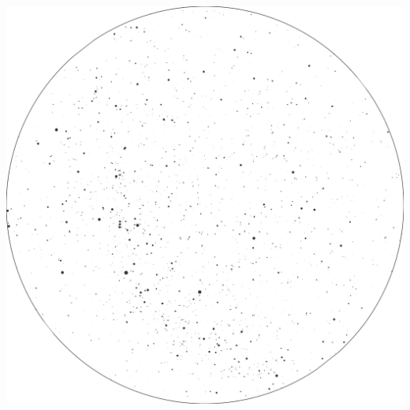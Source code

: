 \documentclass{./SAS-class-skygen}
\begin{document}
	\vspace{0.5cm}
    \begin{center}
    \includegraphics[width=\textwidth]{./pics/skychart51.png}
    \end{center}
    
    
\end{document}
